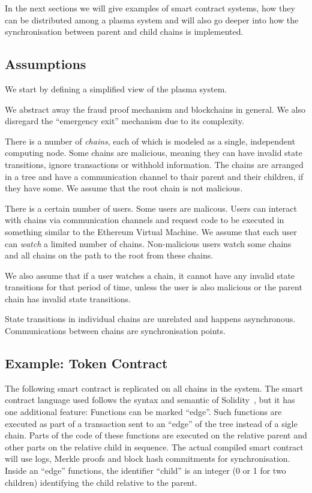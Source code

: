 \documentclass[letterpaper, 11pt]{article}
\begin{document}
In the next sections we will give examples of smart contract systems,
how they can be distributed among a plasma system and will also go deeper
into how the synchronisation between parent and child chains is implemented.
	
\subsection{Assumptions}

We start by defining a simplified view of the plasma system.

We abstract away the fraud proof mechanism and blockchains in general.
We also disregard the ``emergency exit'' mechanism due to its complexity.

There is a number of \emph{chains}, each of which is modeled as a single, independent
computing node. Some chains are malicious, meaning they can have
invalid state transitions, ignore transactions or withhold information.
The chains are arranged in a tree and have a communication channel
to thair parent and their children, if they have some.
We assume that the root chain is not malicious.

There is a certain number of users. Some users are malicous.
Users can interact with chains via communication channels and request code
to be executed in something similar to the Ethereum Virtual Machine.
We assume that each user can \emph{watch} a limited number of chains.
Non-malicious users watch some chains and
all chains on the path to the root from these chains.

We also assume that if a user watches a chain,
it cannot have any invalid state transitions for that period of time,
unless the user is also malicious or the parent chain has
invalid state transitions.

State transitions in individual chains are unrelated and happens asynchronous.
Communications between chains are synchronisation points.
	
\subsection{Example: Token Contract}

The following smart contract is replicated on all chains in
the system. The smart contract language used follows
the syntax and semantic of Solidity~\cite{solidity}, but it has
one additional feature: Functions can be marked ``edge''.
Such functions
are executed as part of a transaction sent to an ``edge''
of the tree instead of a sigle chain. Parts of the code of these functions
are executed on the relative parent and other parts on
the relative child in sequence. The actual compiled smart contract
will use logs, Merkle proofs and block hash commitments for synchronisation.
Inside an ``edge'' functions, the identifier
``child'' is an integer (0 or 1 for two children) identifying the
child relative to the parent.
\end{document}
